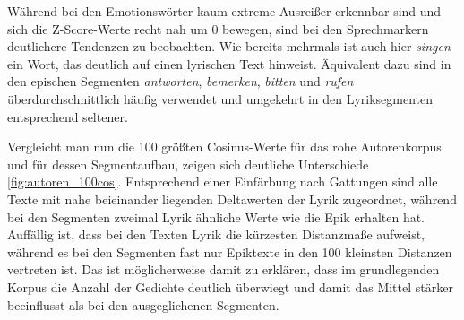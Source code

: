 \documentclass[a4paper,10p]{article}
\begin{document}
Während bei den Emotionswörter kaum extreme Ausreißer erkennbar sind und sich die Z-Score-Werte recht nah um 0 bewegen, sind bei den Sprechmarkern deutlichere Tendenzen zu beobachten. Wie bereits mehrmals ist auch hier \textit{singen} ein Wort, das deutlich auf einen lyrischen Text hinweist. Äquivalent dazu sind in den epischen Segmenten \textit{antworten}, \textit{bemerken}, \textit{bitten} und \textit{rufen} überdurchschnittlich häufig verwendet und umgekehrt in den Lyriksegmenten entsprechend seltener. \par 

Vergleicht man nun die 100 größten Cosinus-Werte für das rohe Autorenkorpus und für dessen Segmentaufbau, zeigen sich deutliche Unterschiede \ref{fig:autoren_100cos}. Entsprechend einer Einfärbung nach Gattungen sind alle Texte mit nahe beieinander liegenden Deltawerten der Lyrik zugeordnet, während bei den Segmenten zweimal Lyrik ähnliche Werte wie die Epik erhalten hat. Auffällig ist, dass bei den Texten Lyrik die kürzesten Distanzmaße aufweist, während es bei den Segmenten fast nur Epiktexte in den 100 kleinsten Distanzen vertreten ist. Das ist möglicherweise damit zu erklären, dass im grundlegenden Korpus die Anzahl der Gedichte deutlich überwiegt und damit das Mittel stärker beeinflusst als bei den ausgeglichenen Segmenten. \par 
\end{document}
